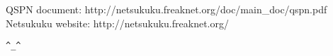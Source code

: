 \documentclass[a4paper]{article}
\newcommand{\href}[2]{ #1 }
\begin{document}






\begin{thebibliography}{99}
	 QSPN document:
		\href{http://netsukuku.freaknet.org/doc/main\_doc/qspn.pdf}{qspn.pdf}
	 Netsukuku website:
		\href{http://netsukuku.freaknet.org/}{http://netsukuku.freaknet.org/}
\end{thebibliography}
\newpage

\begin{center}
\verb|^_^|
\end{center}
\end{document}
